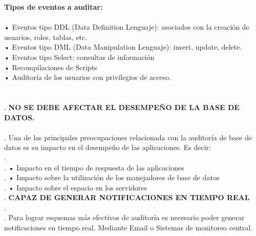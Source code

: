 \documentclass[twoside,twocolumn]{article}
\begin{document}
\begin{flushright}
\begin{itemize}
 \textbf{Tipos de eventos a auditar:}\\ 
 \textbf{}\\ 
•	Eventos tipo DDL (Data Definition Lenguaje): asociados con la creación de usuarios, roles, tablas, etc. \textbf{}\\ 
•	Eventos tipo DML (Data Manipulation Lenguaje): insert, update, delete. \textbf{}\\ 
•	Eventos tipo Select: consultas de información \textbf{}\\ 
•	Recompilaciones de Scripts \textbf{}\\ 
•	Auditoría de los usuarios con privilegios de acceso. \textbf{}\\ 
 \textbf{}\\ 
 \textbf{}\\ .
 \textbf{NO SE DEBE AFECTAR EL DESEMPEÑO DE LA BASE DE DATOS. }\\ 
 \textbf{}\\ .
Una de las principales preocupaciones relacionada con la auditoría de base de datos es su impacto en el desempeño de las aplicaciones. Es decir:  \textbf{}\\ .
 \textbf{}\\ .
•	Impacto en el tiempo de respuesta de las aplicaciones  \textbf{}\\ .
•	Impacto sobre la utilización de los manejadores de base de datos  \textbf{}\\ .
•	Impacto sobre el espacio en los servidores \textbf{}\\ .
 \textbf{CAPAZ DE GENERAR NOTIFICACIONES EN TIEMPO REAL }\\ .
 \textbf{}\\ .
Para lograr esquemas más efectivos de auditoría es necesario poder generar notificaciones en tiempo real. Mediante Email o Sistemas de monitoreo central. 


\end{itemize}
\end{flushright}
\end{document}
